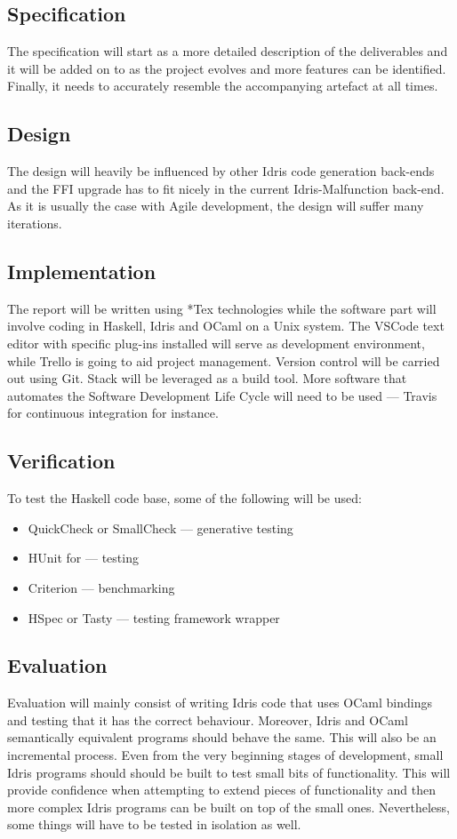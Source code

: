 \documentclass[a4paper]{report}
\begin{document}
\subsection{Specification}
The specification will start as a more detailed description of the
deliverables and it will be added on to as the project evolves and more
features can be identified.
Finally, it needs to accurately resemble the accompanying artefact at all times.
\subsection{Design}
The design will heavily be influenced by other Idris code generation back-ends
and the FFI upgrade has to fit nicely in the current Idris-Malfunction back-end.
As it is usually the case with Agile development, the design will suffer many
iterations.
\subsection{Implementation}
The report will be written using *Tex technologies while the software part will
involve coding in Haskell, Idris and OCaml on a Unix system.
The VSCode text editor with specific plug-ins installed will serve as
development environment, while Trello is going to aid
project management.
Version control will be carried out using Git.
Stack will be leveraged as a build tool.
More software that automates the Software Development Life Cycle
will need to be used --- Travis for continuous integration for instance.

\subsection{Verification}
To test the Haskell code base, some of the following will be used:
\begin{itemize}
	\item QuickCheck or SmallCheck --- generative testing
	\item HUnit for --- testing
	\item Criterion --- benchmarking
	\item HSpec or Tasty --- testing framework wrapper
\end{itemize}

\subsection{Evaluation}
Evaluation will mainly consist of writing Idris code that uses OCaml bindings
and testing that it has the correct behaviour.
Moreover, Idris and OCaml semantically equivalent programs should behave
the same.
This will also be an incremental process.
Even from the very beginning stages of development, small Idris programs should
should be built to test small bits of functionality.
This will provide confidence when attempting to extend pieces of functionality
and then more complex Idris programs can be built on top of the small ones.
Nevertheless, some things will have to be tested in isolation as well.
\end{document}
